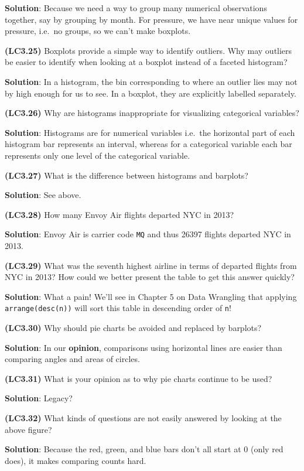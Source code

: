 \documentclass[12pt,]{krantz}
\theoremstyle{definition}
\theoremstyle{definition}
\theoremstyle{definition}
\theoremstyle{remark}
\begin{document}
\textbf{Solution}: Because we need a way to group many numerical
observations together, say by grouping by month. For pressure, we have
near unique values for pressure, i.e.~no groups, so we can't make
boxplots.

\textbf{(LC3.25)} Boxplots provide a simple way to identify outliers.
Why may outliers be easier to identify when looking at a boxplot instead
of a faceted histogram?

\textbf{Solution}: In a histogram, the bin corresponding to where an
outlier lies may not by high enough for us to see. In a boxplot, they
are explicitly labelled separately.

\textbf{(LC3.26)} Why are histograms inappropriate for visualizing
categorical variables?

\textbf{Solution}: Histograms are for numerical variables i.e.~the
horizontal part of each histogram bar represents an interval, whereas
for a categorical variable each bar represents only one level of the
categorical variable.

\textbf{(LC3.27)} What is the difference between histograms and
barplots?

\textbf{Solution}: See above.

\textbf{(LC3.28)} How many Envoy Air flights departed NYC in 2013?

\textbf{Solution}: Envoy Air is carrier code \texttt{MQ} and thus 26397
flights departed NYC in 2013.

\textbf{(LC3.29)} What was the seventh highest airline in terms of
departed flights from NYC in 2013? How could we better present the table
to get this answer quickly?

\textbf{Solution}: What a pain! We'll see in Chapter 5 on Data Wrangling
that applying \texttt{arrange(desc(n))} will sort this table in
descending order of \texttt{n}!

\textbf{(LC3.30)} Why should pie charts be avoided and replaced by
barplots?

\textbf{Solution}: In our \textbf{opinion}, comparisons using horizontal
lines are easier than comparing angles and areas of circles.

\textbf{(LC3.31)} What is your opinion as to why pie charts continue to
be used?

\textbf{Solution}: Legacy?

\textbf{(LC3.32)} What kinds of questions are not easily answered by
looking at the above figure?

\textbf{Solution}: Because the red, green, and blue bars don't all start
at 0 (only red does), it makes comparing counts hard.
\end{document}
